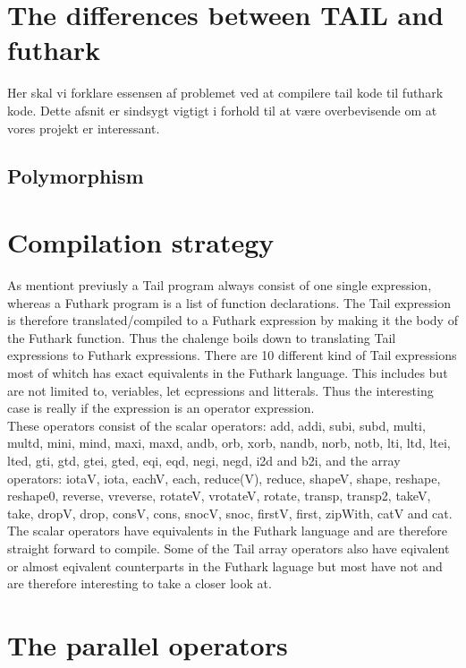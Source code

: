 \documentclass[11pt]{article}
\begin{document}
\section{The differences between TAIL and futhark}

Her skal vi forklare essensen af problemet ved at compilere tail kode til futhark kode. Dette afsnit er sindsygt vigtigt i forhold til at være overbevisende om at vores projekt er interessant. 

\subsection{Polymorphism}

\section{Compilation strategy}
As mentiont previusly a Tail program always consist of one single expression, whereas a Futhark program is a list of function declarations. The Tail expression is therefore translated/compiled to a Futhark expression by making it the body of the Futhark function. 
Thus the chalenge boils down to translating Tail expressions to Futhark expressions. 
There are 10 different kind of Tail expressions most of whitch has exact equivalents in the Futhark language. This includes but are not limited to, veriables, let ecpressions and litterals. Thus the interesting case is really if the expression is an operator expression.\\

These operators consist of the scalar operators: add, addi, subi, subd, multi, multd, mini, mind, maxi, maxd, andb, orb, xorb, nandb, norb, notb, lti, ltd, ltei, lted, gti, gtd, gtei, gted, eqi, eqd, negi, negd, i2d and b2i, and the array operators: iotaV, iota, eachV, each, reduce(V), reduce, shapeV, shape, reshape, reshape0, reverse, vreverse, rotateV, vrotateV, rotate, transp, transp2, takeV, take, dropV, drop, consV, cons, snocV, snoc, firstV, first, zipWith, catV and cat. \\

The scalar operators have equivalents in the Futhark language and are therefore straight forward to compile. Some of the Tail array operators also have eqivalent or almost eqivalent counterparts in the Futhark laguage but most have not and are therefore interesting to take a closer look at.

\section{The parallel operators}
\end{document}
